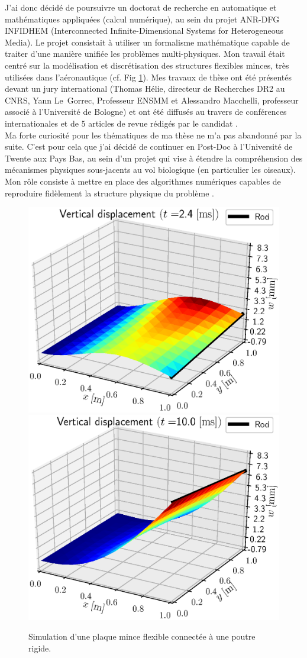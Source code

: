 \documentclass[french]{article}
\begin{document}
J'ai donc décidé de poursuivre un doctorat de recherche en automatique et mathématiques appliquées (calcul numérique), au sein du projet ANR-DFG INFIDHEM (Interconnected Infinite-Dimensional Systems for Heterogeneous Media). Le projet consistait \`a utiliser un formalisme mathématique capable de traiter d'une manière unifiée les problèmes multi-physiques. Mon travail était centré sur la modélisation et discrétisation des structures flexibles minces, très utilisées dans l'aéronautique (cf. Fig \ref{fig:IntRod}). Mes travaux de thèse ont été présentés devant un jury international (Thomas Hélie, directeur de Recherches DR2 au CNRS, Yann Le~Gorrec, Professeur ENSMM et Alessandro Macchelli, professeur associé \`a l'Universit\'e de Bologne) et ont été diffusés au travers de conférences internationales et de 5 articles de revue rédigés par le candidat \cite{brugnoli2019ammmin,brugnoli2019ammkir,brugnoli2020msd,brugnoli2021ther,brugnoli2021num}. \\

Ma forte curiosit\'e pour les thématiques de ma thèse ne m'a pas abandonné par la suite. C'est pour cela que j'ai décidé de continuer en Post-Doc \`a l'Universit\'e de Twente aux Pays Bas, au sein d'un projet qui vise \`a étendre la compréhension des mécanismes physiques sous-jacents au vol biologique (en particulier les oiseaux). Mon rôle consiste \`a mettre en place des algorithmes numériques capables de reproduire fidèlement la structure physique du problème \cite{califano2021}.

\begin{figure}[h]
	\includegraphics[width=0.45\linewidth]{SnapRod_t25.eps}
	\includegraphics[width=0.45\linewidth]{SnapRod_t100.eps}
	\caption{Simulation d'une plaque mince flexible connectée \`a une poutre rigide.}
	\label{fig:IntRod}
\end{figure}
\end{document}
